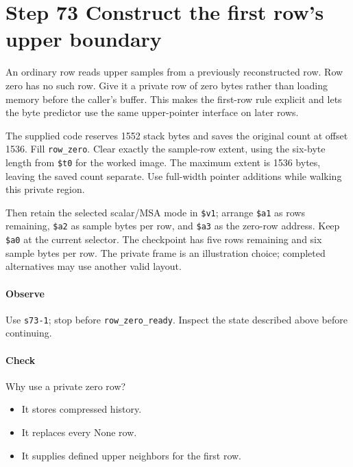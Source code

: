 \section{Step 73 Construct the first row’s upper boundary}
An ordinary row reads upper samples from a previously reconstructed row. Row zero has no such row. Give it a private row of zero bytes rather than loading memory before the caller’s buffer. This makes the first-row rule explicit and lets the byte predictor use the same upper-pointer interface on later rows.

The supplied code reserves 1552 stack bytes and saves the original count at offset 1536. Fill \texttt{row\_zero}. Clear exactly the sample-row extent, using the six-byte length from \texttt{\$t0} for the worked image. The maximum extent is 1536 bytes, leaving the saved count separate. Use full-width pointer additions while walking this private region.

Then retain the selected scalar/MSA mode in \texttt{\$v1}; arrange \texttt{\$a1} as rows remaining, \texttt{\$a2} as sample bytes per row, and \texttt{\$a3} as the zero-row address. Keep \texttt{\$a0} at the current selector. The checkpoint has five rows remaining and six sample bytes per row. The private frame is an illustration choice; completed alternatives may use another valid layout.

\paragraph{Observe} Use \texttt{s73-1}; stop before \texttt{row\_zero\_ready}. Inspect the state described above before continuing.

\paragraph{Check} Why use a private zero row?
\begin{itemize}
  \item[A.] It stores compressed history.
  \item[B.] It replaces every None row.
  \item[C.] It supplies defined upper neighbors for the first row.
\end{itemize}
